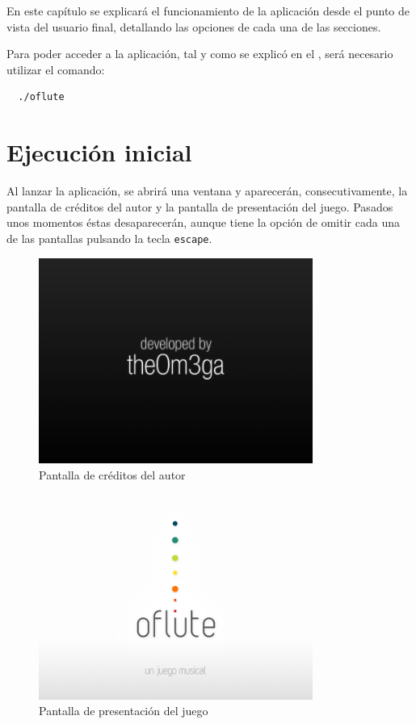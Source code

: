 En este capítulo se explicará el funcionamiento de la aplicación desde el punto
de vista del usuario final, detallando las opciones de cada una de las secciones.

Para poder acceder a la aplicación, tal y como se explicó en el
\textit{}, será necesario utilizar el comando:

\begin{verbatim}
  ./oflute
\end{verbatim}

\section{Ejecución inicial}
Al lanzar la aplicación, se abrirá una ventana y aparecerán, consecutivamente,
la pantalla de créditos del autor y la pantalla de presentación del
juego. Pasados unos momentos éstas desaparecerán, aunque tiene la opción de
omitir cada una de las pantallas pulsando la tecla \texttt{escape}.

\begin{figure}[h!]
  \centering
  \includegraphics[width=0.8\textwidth]{apendice_manual_usuario/imagen_estadoAutor}
  \caption{Pantalla de créditos del autor}
  \vspace{-1cm}
\end{figure}

\begin{figure}[h!]
  \centering
  \includegraphics[width=0.8\textwidth]{apendice_manual_usuario/imagen_estadoIntro}
  \caption{Pantalla de presentación del juego}
  \vspace{-0.3cm}
\end{figure}

